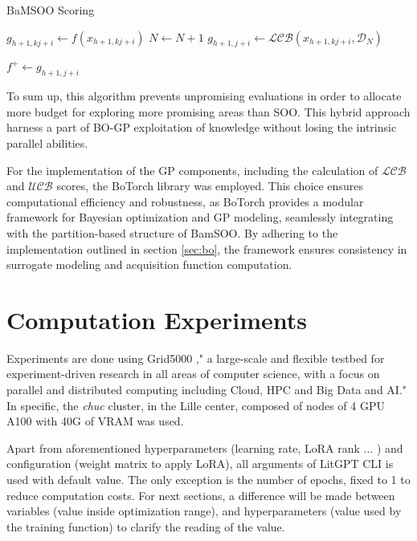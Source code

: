 \documentclass[runningheads]{llncs}
\begin{document}
\begin{algorithm}
\caption{BaMSOO Scoring}
\label{algo:bamsoo}
\begin{algorithmic}[1]
                 
                    \State $g_{h+1,kj+i} \gets f(x_{h+1,kj+i}) $ 
                    \State $N \gets N+1$ 
                \Else
                    \State $g_{h+1,j+i} \gets \mathcal{LCB}(x_{h+1,kj+i},\mathcal D_N) $ 
                \EndIf

                    \State $f^+ \gets g_{h+1,j+i} $ 
                \EndIf         
\end{algorithmic}
\end{algorithm}

To sum up, this algorithm prevents unpromising evaluations in order to allocate more budget for exploring more promising areas than SOO. This hybrid approach harness a part of BO-GP exploitation of knowledge without losing the intrinsic parallel abilities.

For the implementation of the GP components, including the calculation of $\mathcal {LCB}$ and $\mathcal {UCB}$ scores, the BoTorch library was employed. This choice ensures computational efficiency and robustness, as BoTorch provides a modular framework for Bayesian optimization and GP modeling, seamlessly integrating with the partition-based structure of BamSOO. By adhering to the implementation outlined in section \ref{sec:bo}, the framework ensures consistency in surrogate modeling and acquisition function computation.

\section{Computation Experiments }
\label{sec:comp_exp}
Experiments are done using Grid5000 \cite{balouek_adding_2012}," a large-scale and flexible testbed for experiment-driven research in all areas of computer science, with a focus on parallel and distributed computing including Cloud, HPC and Big Data and AI." In specific, the \textit{chuc} cluster, in the Lille center, composed of nodes of 4 GPU A100 with 40G of VRAM was used. 

Apart from aforementioned hyperparameters (learning rate, LoRA rank ... ) and configuration (weight matrix to apply LoRA), all arguments of LitGPT CLI is used with default value. The only exception is the number of epochs, fixed to 1 to reduce computation costs. For next sections, a difference will be made between variables (value inside optimization range), and hyperparameters (value used by the training function) to clarify the reading of the value. 
\end{document}
